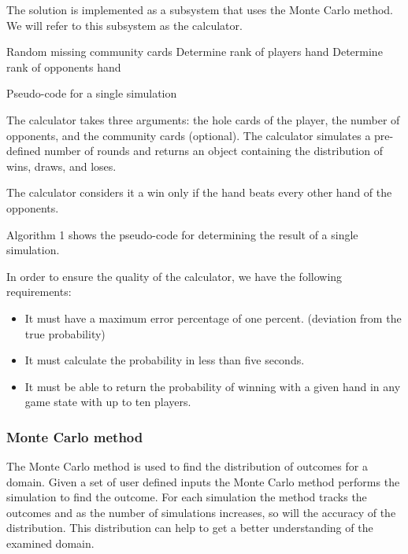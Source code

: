 The solution is implemented as a subsystem that uses the Monte Carlo method. We will refer to this subsystem as the calculator.

\LinesNumbered
\vspace{4mm}
\begin{algorithm}[H]
Random missing community cards\;
Determine rank of players hand\;
   {
    Determine rank of opponents hand\;
  }
  \;
\caption{Pseudo-code for a single simulation}
\end{algorithm}
\vspace{4mm}

The calculator takes three arguments: the hole cards of the player, the number of opponents, and the community cards (optional). The calculator simulates a pre-defined number of rounds and returns an object containing the distribution of wins, draws, and loses.

The calculator considers it a win only if the hand beats every other hand of the opponents.

Algorithm 1 shows the pseudo-code for determining the result of a single simulation.

In order to ensure the quality of the calculator, we have the following requirements:
\begin{itemize}
\item It must have a maximum error percentage of one percent. (deviation from the true probability)
\item It must calculate the probability in less than five seconds.
\item It must be able to return the probability of winning with a given hand in any game state with up to ten players.
\end{itemize}

\subsubsection{Monte Carlo method}
The Monte Carlo method is used to find the distribution of outcomes for a domain. Given a set of user defined inputs the Monte Carlo method performs the simulation to find the outcome. For each simulation the method tracks the outcomes and as the number of simulations increases, so will the accuracy of the distribution. This distribution can help to get a better understanding of the examined domain.

